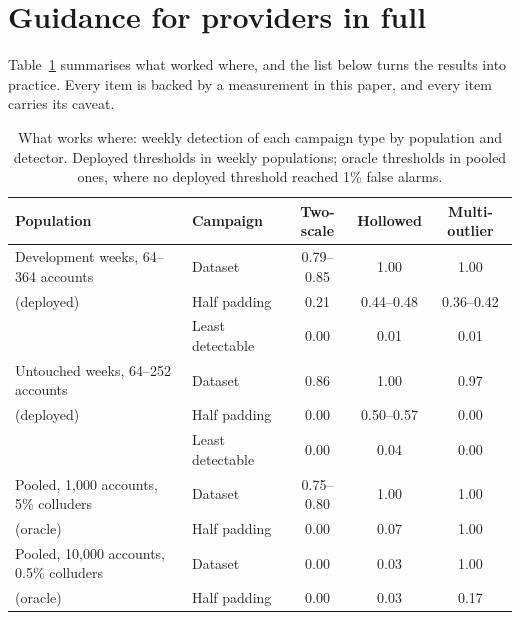 \section{Guidance for providers in full}
\label{sec:guidance-full}

Table~\ref{tab:regime-full} summarises what worked where, and the list below turns the results into practice. Every item is backed by a measurement in this paper, and every item carries its caveat.

\begin{table}[t]
\caption{What works where: weekly detection of each campaign type by population and detector. Deployed thresholds in weekly populations; oracle thresholds in pooled ones, where no deployed threshold reached 1\% false alarms.}
\label{tab:regime-full}
\begin{center}
\small
\begin{tabular}{llccc}
\toprule
Population & Campaign & Two-scale & Hollowed & Multi-outlier \\
\midrule
Development weeks, 64--364 accounts & Dataset & 0.79--0.85 & 1.00 & 1.00 \\
\quad (deployed) & Half padding & 0.21 & 0.44--0.48 & 0.36--0.42 \\
 & Least detectable & 0.00 & 0.01 & 0.01 \\
Untouched weeks, 64--252 accounts & Dataset & 0.86 & 1.00 & 0.97 \\
\quad (deployed) & Half padding & 0.00 & 0.50--0.57 & 0.00 \\
 & Least detectable & 0.00 & 0.04 & 0.00 \\
Pooled, 1{,}000 accounts, 5\% colluders & Dataset & 0.75--0.80 & 1.00 & 1.00 \\
\quad (oracle) & Half padding & 0.00 & 0.07 & 1.00 \\
Pooled, 10{,}000 accounts, 0.5\% colluders & Dataset & 0.00 & 0.03 & 1.00 \\
\quad (oracle) & Half padding & 0.00 & 0.03 & 0.17 \\
\bottomrule
\end{tabular}
\end{center}
\end{table}

